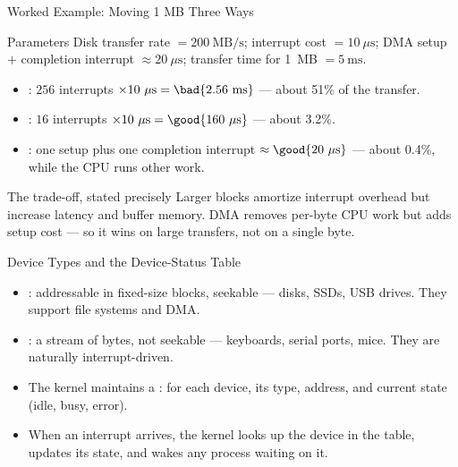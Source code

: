 \documentclass[aspectratio=169]{beamer}
\begin{document}
\begin{frame}{Worked Example: Moving 1 MB Three Ways}
  \begin{block}{Parameters}
    Disk transfer rate $= 200\ \text{MB/s}$; interrupt cost $= 10\ \mu\text{s}$;
    DMA setup $+$ completion interrupt $\approx 20\ \mu\text{s}$; transfer time
    for 1~MB $= 5\ \text{ms}$.
  \end{block}
  \begin{itemize}
    \item {}: $256$ interrupts $\times
      10\ \mu\text{s} = \bad{2.56\ \text{ms}}$ --- about 51\% of the transfer.
    \item {}: $16$ interrupts $\times
      10\ \mu\text{s} = \good{160\ \mu\text{s}}$ --- about 3.2\%.
    \item {}: one setup plus one completion interrupt $\approx
      \good{20\ \mu\text{s}}$ --- about 0.4\%, while the CPU runs other work.
  \end{itemize}
  \vspace{0.15cm}
  \begin{alertblock}{The trade-off, stated precisely}
    Larger blocks amortize interrupt overhead but increase latency and buffer
    memory. DMA removes per-byte CPU work but adds setup cost --- so it wins on
    large transfers, not on a single byte.
  \end{alertblock}
\end{frame}

\begin{frame}{Device Types and the Device-Status Table}
  \begin{itemize}
    \item {}: addressable in fixed-size blocks, seekable ---
      disks, SSDs, USB drives. They support file systems and DMA.
    \item {}: a stream of bytes, not seekable ---
      keyboards, serial ports, mice. They are naturally interrupt-driven.
    \item The kernel maintains a : for each device, its
      type, address, and current state (idle, busy, error).
    \item When an interrupt arrives, the kernel looks up the device in the table,
      updates its state, and wakes any process waiting on it.
  \end{itemize}
  \vspace{0.2cm}
\end{frame}
\end{document}
